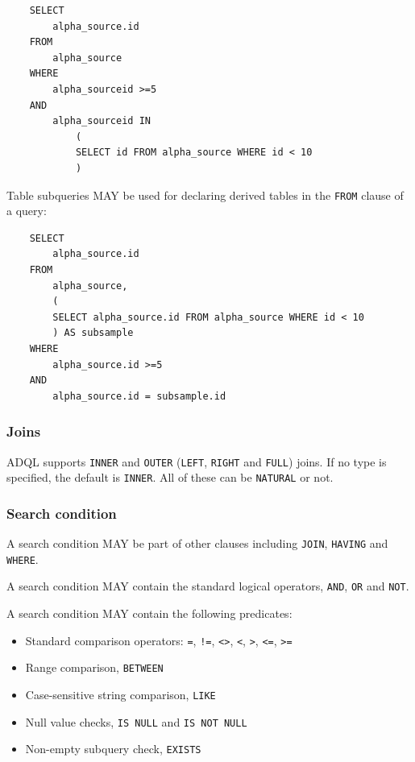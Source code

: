 \documentclass[11pt,a4paper]{ivoa}
\begin{document}
\begin{verbatim}
    SELECT
        alpha_source.id
    FROM 
        alpha_source
    WHERE
        alpha_sourceid >=5
    AND
        alpha_sourceid IN 
            (
            SELECT id FROM alpha_source WHERE id < 10
            )
\end{verbatim}

Table subqueries MAY be used for declaring derived tables in the \verb:FROM: clause
of a query:

\begin{verbatim}
    SELECT
        alpha_source.id
    FROM
        alpha_source,
        (
        SELECT alpha_source.id FROM alpha_source WHERE id < 10
        ) AS subsample
    WHERE
        alpha_source.id >=5
    AND
        alpha_source.id = subsample.id
\end{verbatim}

\subsubsection{Joins}
\label{sec:joins}

ADQL supports \verb:INNER: and \verb:OUTER:
(\verb:LEFT:, \verb:RIGHT: and \verb:FULL:) joins. If no type is specified, the
default is \verb:INNER:. All of these can be \verb:NATURAL: or not.


\subsubsection{Search condition}
\label{sec:search}

A search condition MAY be part of other clauses including \verb:JOIN:, \verb:HAVING: and \verb:WHERE:.

A search condition MAY contain the standard logical operators, \verb:AND:, \verb:OR: and \verb:NOT:.

A search condition MAY contain the following predicates:

\begin{itemize}
    \item Standard comparison operators: \verb:=:, \verb:!=:, \verb:<>:, \verb:<:, \verb:>:, \verb:<=:, \verb:>=:
    \item Range comparison, \verb:BETWEEN:
    \item Case-sensitive string comparison, \verb:LIKE:
    \item Null value checks, \verb:IS NULL: and \verb:IS NOT NULL:
    \item Non-empty subquery check, \verb:EXISTS:
\end{itemize}
\end{document}
